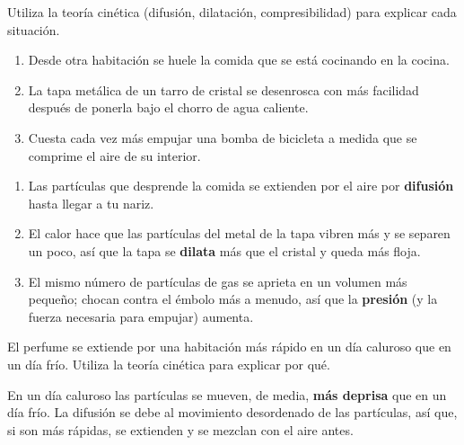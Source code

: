 \begin{exercise}
    Utiliza la teoría cinética (difusión, dilatación, compresibilidad) para explicar cada situación.
    \begin{enumerate}[label=\letraminuscula]
        \item Desde otra habitación se huele la comida que se está cocinando en la cocina.
        \item La tapa metálica de un tarro de cristal se desenrosca con más facilidad después de ponerla bajo el chorro de agua caliente.
        \item Cuesta cada vez más empujar una bomba de bicicleta a medida que se comprime el aire de su interior.
    \end{enumerate}
    \begin{solu}
        \begin{enumerate}[label=\alph*)]
            \item Las partículas que desprende la comida se extienden por el aire por \textbf{difusión} hasta llegar a tu nariz.
            \item El calor hace que las partículas del metal de la tapa vibren más y se separen un poco, así que la tapa se \textbf{dilata} más que el cristal y queda más floja.
            \item El mismo número de partículas de gas se aprieta en un volumen más pequeño; chocan contra el émbolo más a menudo, así que la \textbf{presión} (y la fuerza necesaria para empujar) aumenta.
        \end{enumerate}
    \end{solu}
\end{exercise}

\begin{exercise}
    El perfume se extiende por una habitación más rápido en un día caluroso que en un día frío. Utiliza la teoría cinética para explicar por qué.
    \begin{solu}
        En un día caluroso las partículas se mueven, de media, \textbf{más deprisa} que en un día frío. La difusión se debe al movimiento desordenado de las partículas, así que, si son más rápidas, se extienden y se mezclan con el aire antes.
    \end{solu}
\end{exercise}

